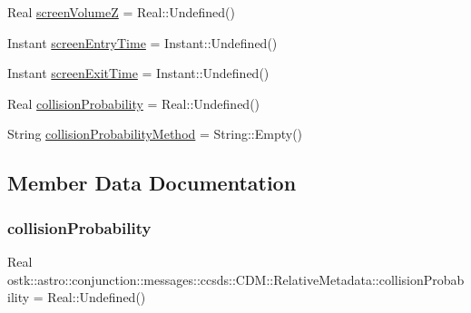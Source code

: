 \begin{DoxyCompactItemize}
Real \hyperlink{structostk_1_1astro_1_1conjunction_1_1messages_1_1ccsds_1_1_c_d_m_1_1_relative_metadata_a9a8574e2bc75a5200ff14b90c231f700}{screen\+VolumeZ} = Real\+::\+Undefined()
\item 
Instant \hyperlink{structostk_1_1astro_1_1conjunction_1_1messages_1_1ccsds_1_1_c_d_m_1_1_relative_metadata_a66f0717458e9b17d7efd7db99c933f3f}{screen\+Entry\+Time} = Instant\+::\+Undefined()
\item 
Instant \hyperlink{structostk_1_1astro_1_1conjunction_1_1messages_1_1ccsds_1_1_c_d_m_1_1_relative_metadata_a4ec3cda5aff9fbd3b1037e5143c4e7c5}{screen\+Exit\+Time} = Instant\+::\+Undefined()
\item 
Real \hyperlink{structostk_1_1astro_1_1conjunction_1_1messages_1_1ccsds_1_1_c_d_m_1_1_relative_metadata_a86d304c892baba0130a1ca23e6eb9d3b}{collision\+Probability} = Real\+::\+Undefined()
\item 
String \hyperlink{structostk_1_1astro_1_1conjunction_1_1messages_1_1ccsds_1_1_c_d_m_1_1_relative_metadata_ad4a50fb4d316c140053d56e203985005}{collision\+Probability\+Method} = String\+::\+Empty()
\end{DoxyCompactItemize}


\subsection{Member Data Documentation}
\mbox{\label{structostk_1_1astro_1_1conjunction_1_1messages_1_1ccsds_1_1_c_d_m_1_1_relative_metadata_a86d304c892baba0130a1ca23e6eb9d3b}} 
\subsubsection{\texorpdfstring{collision\+Probability}{collisionProbability}}
{\footnotesize\ttfamily Real ostk\+::astro\+::conjunction\+::messages\+::ccsds\+::\+C\+D\+M\+::\+Relative\+Metadata\+::collision\+Probability = Real\+::\+Undefined()}

